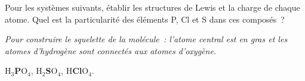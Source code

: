 
Pour les syst\`emes suivants, \'etablir les structures de Lewis et la charge de chaque atome.
Quel est la particularit\'e des \'el\'ements P, Cl et S dans ces compos\'es~?

{\small \textit{Pour construire le squelette de la mol\'ecule~: l'atome central est en gras et les atomes d'hydrog\`ene 
sont connect\'es aux atomes d'oxyg\`ene.}}

\vspace{0.5cm}

\centerline{H$_3$\textbf{P}O$_4$, H$_2$\textbf{S}O$_4$, H\textbf{Cl}O$_4$.}

%
%
%
%
%
%
%

